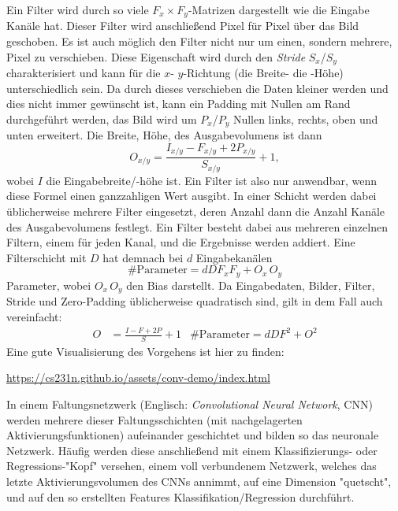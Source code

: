 		Ein Filter wird durch so viele \( F_x \times F_y \)-Matrizen dargestellt wie die Eingabe Kanäle hat. Dieser Filter wird anschließend Pixel für Pixel über das Bild geschoben. Es ist auch möglich den Filter nicht nur um einen, sondern mehrere, Pixel zu verschieben. Diese Eigenschaft wird durch den \emph{Stride} \( S_x \)/\( S_y \) charakterisiert und kann für die \(x\)- \bzw \(y\)-Richtung (\dh die Breite- \bzw die -Höhe) unterschiedlich sein. Da durch dieses verschieben die Daten kleiner werden und dies nicht immer gewünscht ist, kann ein Padding mit Nullen am Rand durchgeführt werden, \dh das Bild wird um \(P_x\)/\(P_y\) Nullen links, rechts, oben und unten erweitert. Die Breite, \bzw Höhe, des Ausgabevolumens ist dann
		\begin{equation}
			O_{x/y} = \frac{I_{x/y} - F_{x/y} + 2P_{x/y}}{S_{x/y}} + 1,
		\end{equation}
		wobei \(I\) die Eingabebreite/-höhe ist. Ein Filter ist also nur anwendbar, wenn diese Formel einen ganzzahligen Wert ausgibt. In einer Schicht werden dabei üblicherweise mehrere Filter eingesetzt, deren Anzahl dann die Anzahl Kanäle des Ausgabevolumens festlegt. Ein Filter besteht dabei aus mehreren einzelnen Filtern, einem für jeden Kanal, und die Ergebnisse werden addiert. Eine Filterschicht mit \(D\) hat demnach bei \(d\) Eingabekanälen
		\begin{equation}
			\text{\#Parameter} = d D F_x F_y + O_x \, O_y
		\end{equation}
		Parameter, wobei \( O_x \, O_y \) den Bias darstellt. Da Eingabedaten, Bilder, Filter, Stride und Zero-Padding üblicherweise quadratisch sind, gilt in dem Fall auch vereinfacht:
		\begin{align}
			O &= \frac{I - F + 2P}{S} + 1 &
			\text{\#Parameter} = d D F^2 + O^2
		\end{align}
		Eine gute Visualisierung des Vorgehens ist hier zu finden:
		\begin{center}
			\url{https://cs231n.github.io/assets/conv-demo/index.html}
		\end{center}
		In einem Faltungsnetzwerk (Englisch: \emph{Convolutional Neural Network}, CNN) werden mehrere dieser Faltungsschichten (mit nachgelagerten Aktivierungsfunktionen) aufeinander geschichtet und bilden so das neuronale Netzwerk. Häufig werden diese anschließend mit einem Klassifizierungs- oder Regressions-"Kopf" versehen, \dh einem voll verbundenem Netzwerk, welches das letzte Aktivierungsvolumen des CNNs annimmt, auf eine Dimension "quetscht", und auf den so erstellten Features Klassifikation/Regression durchführt.

